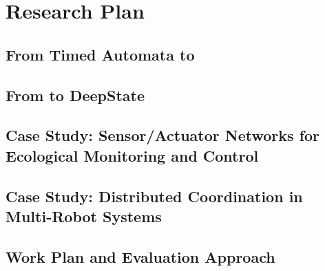 \section{Research Plan}

\subsection{From Timed Automata to \framac}
\label{sec:ta2framac}


\subsection{From \framac to DeepState}
\label{sec:framac2deepstate}



\subsection{Case Study: Sensor/Actuator Networks for Ecological Monitoring and Control}
\label{sec:case-study}


\subsection{Case Study: Distributed Coordination in Multi-Robot Systems}
\label{sec:case-study-robots}


\subsection{Work Plan and Evaluation Approach}
\label{sec:workplan}

